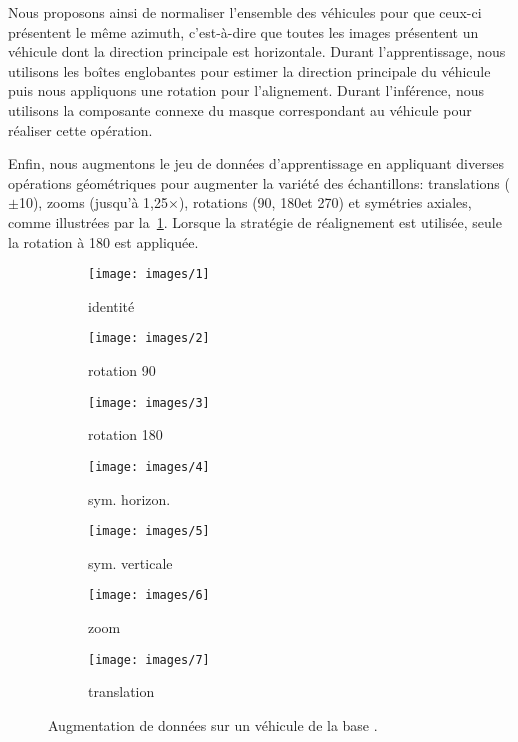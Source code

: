 Nous proposons ainsi de normaliser l'ensemble des véhicules pour que ceux-ci présentent le même azimuth, c'est-à-dire que toutes les images présentent un véhicule dont la direction principale est horizontale. Durant l'apprentissage, nous utilisons les boîtes englobantes pour estimer la direction principale du véhicule puis nous appliquons une rotation pour l'alignement. Durant l'inférence, nous utilisons la composante connexe du masque correspondant au véhicule pour réaliser cette opération.

Enfin, nous augmentons le jeu de données d'apprentissage en appliquant diverses opérations géométriques pour augmenter la variété des échantillons: translations ($\pm$\SI{10}{\px}), zooms (jusqu'à 1,25$\times$), rotations (90\degre, 180\degre et 270\degre) et symétries axiales, comme illustrées par la~\cref{fig:augmented_car}. Lorsque la stratégie de réalignement est utilisée, seule la rotation à 180\degre{} est appliquée.

\begin{figure}[t]
	\begin{subfigure}{0.142\textwidth}
    	\texttt{[image: images/1]}
        \caption*{identité}
    \end{subfigure}%
    \begin{subfigure}{0.142\textwidth}
    	\texttt{[image: images/2]}
        \caption*{rotation 90\degre}
    \end{subfigure}%
    \begin{subfigure}{0.142\textwidth}
    	\texttt{[image: images/3]}
        \caption*{rotation 180\degre}
    \end{subfigure}%
    \begin{subfigure}{0.142\textwidth}
    	\texttt{[image: images/4]}
        \caption*{sym. horizon.}
    \end{subfigure}%
    \begin{subfigure}{0.142\textwidth}
    	\texttt{[image: images/5]}
        \caption*{sym. verticale}
    \end{subfigure}%
    \begin{subfigure}{0.142\textwidth}
    	\texttt{[image: images/6]}
        \caption*{zoom}
    \end{subfigure}%
    \begin{subfigure}{0.142\textwidth}
    	\texttt{[image: images/7]}
        \caption*{translation}
    \end{subfigure}
    \caption{Augmentation de données sur un véhicule de la base .}
    \label{fig:augmented_car}
\end{figure}

